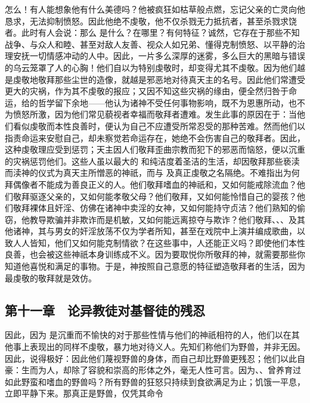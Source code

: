 怎么！有人能想象他有什么美德吗？他被疯狂如枯草般点燃，忘记父亲的亡灵向他恳求，无法抑制愤怒。因此他绝不虔敬，他不仅杀戮无力抵抗者，甚至杀戮求饶者。此时有人会说：那么  是什么？在哪里？有何特征？诚然，它存在于那些不知战争、与众人和睦、甚至对敌人友善、视众人如兄弟、懂得克制愤怒、以平静的治理安抚一切情感冲动的人中。因此，一片多么深厚的迷雾，多么巨大的黑暗与错误的乌云笼罩了人的心胸！他们自以为特别虔敬时，却变得尤其不虔敬。因为他们越是虔敬地敬拜那些尘世的造像，就越是邪恶地对待真天主的名号。因此他们常遭受更大的灾祸，作为其不虔敬的报应；又因不知这些灾祸的缘由，便全然归咎于命运，给的哲学留下余地——他认为诸神不受任何事物影响，既不为恩惠所动，也不为愤怒所激，因为他们常见藐视者幸福而敬拜者遭难。发生此事的原因在于：当他们看似虔敬而本性良善时，便认为自己不应遭受所常忍受的那种苦难。然而他们以指责命运来安慰自己，却未察觉若命运存在，她绝不会伤害自己的敬拜者。因此，这种虔敬理应受到惩罚；天主因人们敬拜歪曲宗教而犯下的邪恶而恼怒，便以沉重的灾祸惩罚他们。这些人虽以最大的  和纯洁度着圣洁的生活，却因敬拜那些亵渎而渎神的仪式为真天主所憎恶的神祇，而与  及真正虔敬之名隔绝。不难指出为何拜偶像者不能成为善良正义的人。他们敬拜嗜血的神祇和，又如何能戒除流血？他们敬拜驱逐父亲的，又如何能孝敬父母？他们敬拜，又如何能怜惜自己的婴孩？他们敬拜裸体且奸淫、仿佛在诸神中卖淫的女神，又如何能持守贞洁？他们熟知的偷窃，他教导欺骗并非欺诈而是机敏，又如何能远离掠夺与欺诈？他们敬拜、、、及其他诸神，其与男女的奸淫放荡不仅为学者所知，甚至在戏院中上演并编成歌曲，以致人人皆知，他们又如何能克制情欲？在这些事中，人还能正义吗？即使他们本性良善，也会被这些神祇本身训练成不义。因为要取悦你所敬拜的神，就需要那些你知道他喜悦和满足的事物。于是，神按照自己意愿的特征塑造敬拜者的生活，因为最虔敬的敬拜就是效仿。\par


\subsection{第十一章　论异教徒对基督徒的残忍}

因此，因为  是沉重而不愉快的对于那些性情与他们的神祇相符的人，他们以在其他事上表现出的同样不虔敬，暴力地对待义人。先知们称他们为野兽，并非无因。因此，说得极好：因此他们蔑视野兽的身体，而自己却比野兽更残忍；他们以此自豪：生而为人，却除了容貌和崇高的形体之外，毫无人性可言。因为、、曾养育过如此野蛮和嗜血的野兽吗？所有野兽的狂怒只持续到食欲满足为止；饥饿一平息，立即平静下来。那真正是野兽，仅凭其命令\par

